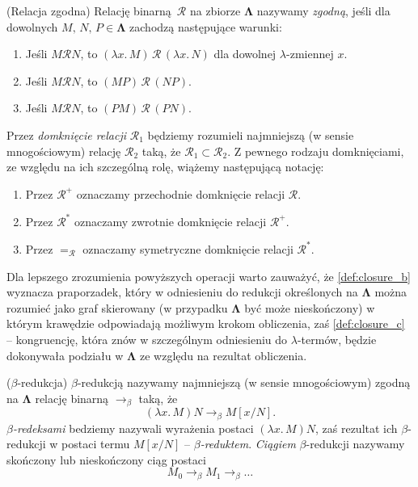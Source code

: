 \begin{definicja}(Relacja zgodna)
  Relację binarną \(\mathcal{R}\) na zbiorze \(\mathbf{\Lambda}\) nazywamy \emph{zgodną}, jeśli dla dowolnych \(M,\,N,\,P \in \mathbf{\Lambda}\) zachodzą następujące warunki:
  \begin{enumerate}[label={(c\arabic*)}, ref={(\arabic*)}]
    \setlength\itemsep{0em}
    \item Jeśli \(M \mathcal{R} N\), to \((\lambda x.\,M)\,\mathcal{R}\,(\lambda x.\,N)\) dla dowolnej \(\lambda\)-zmiennej \(x\).
    \item Jeśli \(M \mathcal{R} N\), to \((MP)\,\mathcal{R}\,(NP)\).
    \item Jeśli \(M \mathcal{R} N\), to \((PM)\,\mathcal{R}\,(PN)\).
  \end{enumerate}
\end{definicja}
Przez \emph{domknięcie relacji} \(\mathcal{R}_1\) będziemy rozumieli najmniejszą (w sensie mnogościowym) relację \(\mathcal{R}_2\) taką, że \(\mathcal{R}_1\subset\mathcal{R}_2\).
  Z pewnego rodzaju domknięciami, ze względu na ich szczególną rolę, wiążemy następującą notację:
  \begin{enumerate}[label=(\alph*), ref={(\alph*)}]
    \setlength\itemsep{0em}
    \item Przez \(\mathcal{R}^{+}\) oznaczamy przechodnie domknięcie relacji \(\mathcal{R}\).\label{def:closure_a}
    \item Przez \(\mathcal{R}^{*}\) oznaczamy zwrotnie domknięcie relacji \(\mathcal{R}^{+}\).\label{def:closure_b}
    \item Przez \(=_{\mathcal{R}}\) oznaczamy symetryczne domknięcie relacji \(\mathcal{R}^{*}\).\label{def:closure_c}
\end{enumerate}
Dla lepszego zrozumienia powyższych operacji warto zauważyć, że \ref{def:closure_b} wyznacza praporzadek, który w odniesieniu do redukcji określonych na \(\mathbf{\Lambda}\) można rozumieć jako graf skierowany (w przypadku \(\mathbf{\Lambda}\) być może nieskończony) w którym krawędzie odpowiadają możliwym krokom obliczenia, zaś \ref{def:closure_c} -- kongruencję, która znów w szczególnym odniesieniu do \(\lambda\)-termów, będzie dokonywała podziału w \(\mathbf{\Lambda}\) ze względu na rezultat obliczenia.
\begin{definicja}(\(\beta\)-redukcja)
  \(\beta\)-redukcją nazywamy najmniejszą (w sensie mnogościowym) zgodną na \(\mathbf{\Lambda}\) relację binarną \(\to_\beta\) taką, że
  \[
    (\lambda x.\,M)N\rightarrow_\beta M[x/N].
  \]
\emph{\(\beta\)-redeksami} bedziemy nazywali wyrażenia postaci \((\lambda x.\, M)N\), zaś rezultat ich \(\beta\)-redukcji w postaci termu \(M[x/N]\) -- \emph{\(\beta\)-reduktem}. \emph{Ciągiem} \(\beta\)-redukcji nazywamy skończony lub nieskończony ciąg postaci
  \[
    M_0 \to_\beta M_1 \to_\beta \dots
  \]
\end{definicja}
